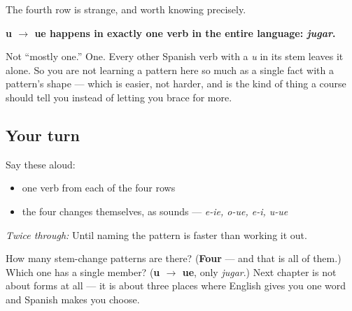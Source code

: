 \begin{grammarlens}[title={Grammar Lens: the pattern with one member}]
The fourth row is strange, and worth knowing precisely.

\textbf{u $\to$ ue happens in exactly one verb in the entire language: \emph{jugar}.}

Not \textquotedblleft{}mostly one.\textquotedblright{} One. Every other Spanish verb with a \emph{u} in its stem leaves it alone. So you are not learning a pattern here so much as a single fact with a pattern's shape — which is easier, not harder, and is the kind of thing a course should tell you instead of letting you brace for more.
\end{grammarlens}

\subsection*{Your turn}
Say these aloud:

\begin{itemize}
\raggedright
  \item one verb from each of the four rows
  \item the four changes themselves, as sounds — \emph{e-ie, o-ue, e-i, u-ue}
\end{itemize}

\emph{Twice through:} Until naming the pattern is faster than working it out.

\begin{tcolorbox}[breakable,colback=teal!4,colframe=teal!35!black,title={Before you move on}]
How many stem-change patterns are there? (\textbf{Four} — and that is all of them.) Which one has a single member? (\textbf{u $\to$ ue}, only \emph{jugar}.) Next chapter is not about forms at all — it is about three places where English gives you one word and Spanish makes you choose.
\end{tcolorbox}
